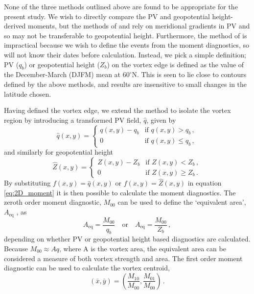 None of the three methods outlined above are found to be appropriate for the
present study. We wish to directly compare the PV and geopotential
height-derived moments, but the methods of \citet{Waugh1999} and
\citet{Nash1996} rely on meridional gradients in PV and so may not be
transferable to geopotential height. Furthermore, the method of
\citet{Matthewman2009} is impractical because we wish to define the events from
the moment diagnostics, so will not know their dates before
calculation. Instead, we pick a simple definition; PV ($q_{b}$) or geopotential
height ($Z_{b}$) on the vortex edge is defined as the value of the
December-March (DJFM) mean at $60^{\circ}$N. This is seen to lie close to
contours defined by the above methods, and results are insensitive to small
changes in the latitude chosen. 

Having defined the vortex edge, we extend the method \citet{Matthewman2009} to
isolate the vortex region by introducing a transformed PV field, $\hat{q}$,
given by
\begin{equation}
 \hat{q}(x,y) = 
 \begin{cases}
   q(x,y) - q_{b} & \text{if $q(x,y) > q_{b}$} \, , \\
   0 & \text{if $q(x,y) \leq q_{b}$} \, , 
 \end{cases}
\end{equation}
and similarly for geopotential height 
\begin{equation}
 \hat{Z}(x,y) = 
 \begin{cases}
   Z(x,y) - Z_{b} & \text{if $Z(x,y) < Z_{b}$} \, , \\
   0 & \text{if $Z(x,y) \geq Z_{b}$} \, . 
 \end{cases}
\end{equation}
By substituting $f(x,y) = \hat{q}(x,y)$ or $f(x,y) = \hat{Z}(x,y)$ in equation
\ref{eq:2D_moment} it is then possible to calculate the moment diagnostics. The
zeroth order moment diagnostic, $M_{00}$ can be used to define the `equivalent
area', $A_{\mathrm{eq}}$ \citep{Matthewman2009}, as
\begin{equation} 
A_{\mathrm{eq}} = \frac{M_{00}}{q_{b}}\quad \text{or} \quad A_{\mathrm{eq}} = \frac{M_{00}}{Z_b}\, ,
\end{equation}
depending on whether PV or geopotential height based diagnostics are
calculated. Because $M_{00} \approx Aq$, where A is the vortex area, the
equivalent area can be considered a measure of both vortex strength and
area. The first order moment diagnostic can be used to calculate the vortex
centroid,
\begin{equation}
(\bar{x}, \bar{y}) = \left( \frac{M_{10}}{M_{00}}, \frac{M_{01}}{M_{00}} \right)
\, . 
\end{equation}

